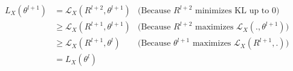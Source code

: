 \documentclass{article}
\begin{document}
\begin{equation*}
    \begin{aligned}
        L_X(\theta^{l+1}) & = \mathcal{L}_X(R^{l+2}, \theta^{l+1})   & \text{(Because $R^{l+2}$ minimizes KL up to $0$)}                     \\
                          & \ge \mathcal{L}_X(R^{l+1}, \theta^{l+1}) & \text{(Because $R^{l+2}$ maximizes $\mathcal{L}_X(., \theta^{l+1})$)} \\
                          & \ge \mathcal{L}_X(R^{l+1}, \theta^{l})   & \text{(Because $\theta^{l+1}$ maximizes $\mathcal{L}_X(R^{l+1}, .)$)} \\
                          & = L_X(\theta^l)
    \end{aligned}
\end{equation*}
\end{document}
